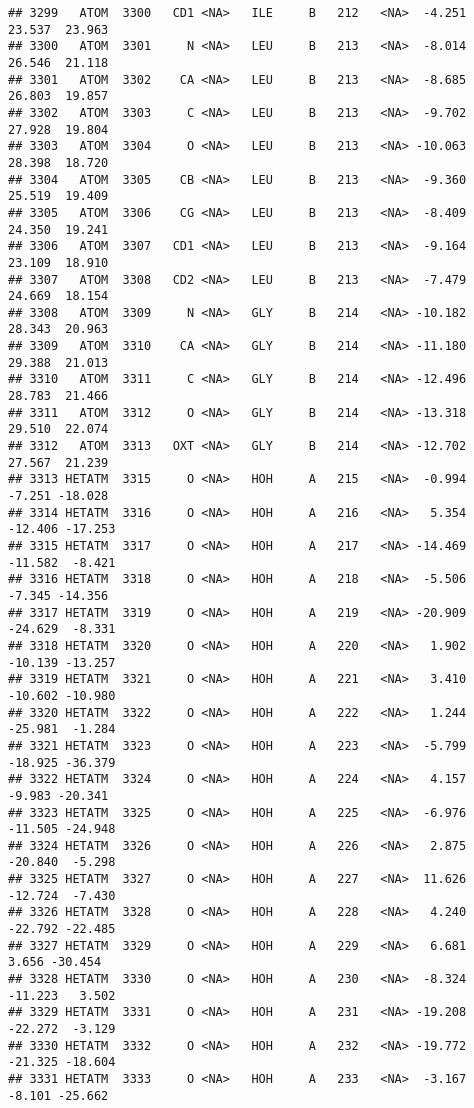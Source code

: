 \documentclass[
]{article}
\begin{document}
\begin{verbatim}
## 3299   ATOM  3300   CD1 <NA>   ILE     B   212   <NA>  -4.251  23.537  23.963
## 3300   ATOM  3301     N <NA>   LEU     B   213   <NA>  -8.014  26.546  21.118
## 3301   ATOM  3302    CA <NA>   LEU     B   213   <NA>  -8.685  26.803  19.857
## 3302   ATOM  3303     C <NA>   LEU     B   213   <NA>  -9.702  27.928  19.804
## 3303   ATOM  3304     O <NA>   LEU     B   213   <NA> -10.063  28.398  18.720
## 3304   ATOM  3305    CB <NA>   LEU     B   213   <NA>  -9.360  25.519  19.409
## 3305   ATOM  3306    CG <NA>   LEU     B   213   <NA>  -8.409  24.350  19.241
## 3306   ATOM  3307   CD1 <NA>   LEU     B   213   <NA>  -9.164  23.109  18.910
## 3307   ATOM  3308   CD2 <NA>   LEU     B   213   <NA>  -7.479  24.669  18.154
## 3308   ATOM  3309     N <NA>   GLY     B   214   <NA> -10.182  28.343  20.963
## 3309   ATOM  3310    CA <NA>   GLY     B   214   <NA> -11.180  29.388  21.013
## 3310   ATOM  3311     C <NA>   GLY     B   214   <NA> -12.496  28.783  21.466
## 3311   ATOM  3312     O <NA>   GLY     B   214   <NA> -13.318  29.510  22.074
## 3312   ATOM  3313   OXT <NA>   GLY     B   214   <NA> -12.702  27.567  21.239
## 3313 HETATM  3315     O <NA>   HOH     A   215   <NA>  -0.994  -7.251 -18.028
## 3314 HETATM  3316     O <NA>   HOH     A   216   <NA>   5.354 -12.406 -17.253
## 3315 HETATM  3317     O <NA>   HOH     A   217   <NA> -14.469 -11.582  -8.421
## 3316 HETATM  3318     O <NA>   HOH     A   218   <NA>  -5.506  -7.345 -14.356
## 3317 HETATM  3319     O <NA>   HOH     A   219   <NA> -20.909 -24.629  -8.331
## 3318 HETATM  3320     O <NA>   HOH     A   220   <NA>   1.902 -10.139 -13.257
## 3319 HETATM  3321     O <NA>   HOH     A   221   <NA>   3.410 -10.602 -10.980
## 3320 HETATM  3322     O <NA>   HOH     A   222   <NA>   1.244 -25.981  -1.284
## 3321 HETATM  3323     O <NA>   HOH     A   223   <NA>  -5.799 -18.925 -36.379
## 3322 HETATM  3324     O <NA>   HOH     A   224   <NA>   4.157  -9.983 -20.341
## 3323 HETATM  3325     O <NA>   HOH     A   225   <NA>  -6.976 -11.505 -24.948
## 3324 HETATM  3326     O <NA>   HOH     A   226   <NA>   2.875 -20.840  -5.298
## 3325 HETATM  3327     O <NA>   HOH     A   227   <NA>  11.626 -12.724  -7.430
## 3326 HETATM  3328     O <NA>   HOH     A   228   <NA>   4.240 -22.792 -22.485
## 3327 HETATM  3329     O <NA>   HOH     A   229   <NA>   6.681   3.656 -30.454
## 3328 HETATM  3330     O <NA>   HOH     A   230   <NA>  -8.324 -11.223   3.502
## 3329 HETATM  3331     O <NA>   HOH     A   231   <NA> -19.208 -22.272  -3.129
## 3330 HETATM  3332     O <NA>   HOH     A   232   <NA> -19.772 -21.325 -18.604
## 3331 HETATM  3333     O <NA>   HOH     A   233   <NA>  -3.167  -8.101 -25.662

\end{verbatim}
\end{document}

